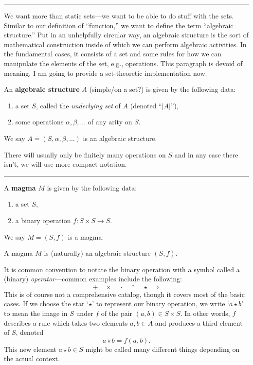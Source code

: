 \documentclass[12pt]{article}
\newcommand{\keyword}[1]{\textbf{#1}}
\newcommand{\sepline}{\rule{\textwidth}{0.4pt}}
\theoremstyle{definition}
\newcommand{\<}{\left\langle}
\renewcommand{\>}{\right\rangle}
\renewcommand{\_}[1]{{_{#1}}}
\begin{document}
\sepline

We want more than static sets---we want to be able to do stuff with the sets.
Similar to our definition of ``function,'' we want to define the term ``algebraic structure.''
Put in an unhelpfully circular way, an algebraic structure is the sort of mathematical construction inside of which we can perform algebraic activities.
In the fundamental cases, it consists of a set and some rules for how we can manipulate the elements of the set, e.g., operations.
This paragraph is devoid of meaning.
I am going to provide a set-theoretic implementation now.


An \keyword{algebraic structure} $A$ (simple/on a set?) is given by the following data:
\begin{enumerate}
    \item a set $S$, called the \emph{underlying set} of $A$ (denoted ``$|A|$''),
    \item some operations $\alpha, \beta, \dots$ of any arity on $S$.
\end{enumerate}
We say $A = (S, \alpha, \beta, \dots)$ is an algebraic structure.

There will usually only be finitely many operations on $S$ and in any case there isn't, we will use more compact notation.

\sepline



A \keyword{magma} $M$ is given by the following data:
\begin{enumerate}[$\bullet$]
    \item a set $S$,
    \item a binary operation $f : S \times S \to S$.
\end{enumerate}
We say $M = (S, f)$ is a magma.

A magma $M$ is (naturally) an algebraic structure $(S, f)$.

It is common convention to notate the binary operation with a symbol called a (binary) \emph{operator}---common examples include the following:
\[
    + \quad \times \quad \cdot \quad * \quad \star \quad \circ
\]
This is of course not a comprehensive catalog, though it covers most of the basic cases.
If we choose the star `$\star$' to represent our binary operation, we write `$a \star b$' to mean the image in $S$ under $f$ of the pair $(a, b) \in S \times S$.
In other words, $f$ describes a rule which takes two elements $a, b \in A$ and produces a third element of $S$, denoted 
\[
    a \star b = f(a, b).
\]
This new element $a \star b \in S$ might be called many different things depending on the actual context.
\end{document}
